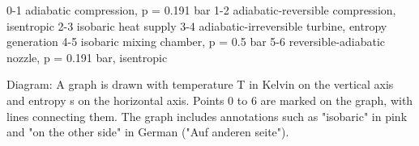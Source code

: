 0-1 adiabatic compression, p = 0.191 bar  
1-2 adiabatic-reversible compression, isentropic  
2-3 isobaric heat supply  
3-4 adiabatic-irreversible turbine, entropy generation  
4-5 isobaric mixing chamber, p = 0.5 bar  
5-6 reversible-adiabatic nozzle, p = 0.191 bar, isentropic  

Diagram:  
A graph is drawn with temperature T in Kelvin on the vertical axis and entropy s on the horizontal axis. Points 0 to 6 are marked on the graph, with lines connecting them. The graph includes annotations such as "isobaric" in pink and "on the other side" in German ("Auf anderen seite").